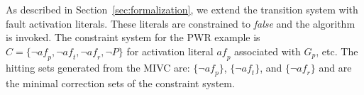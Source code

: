 As described in Section~\ref{sec:formalization}, we extend the transition system with fault activation literals. These literals are constrained to {\em false} and the \aivcalg algorithm is invoked. The constraint system for the PWR example is $C = \{\neg\mathit{af}_p, \neg\mathit{af}_t, \neg\mathit{af}_r, \neg P\}$ for activation literal $\mathit{af}_p$ associated with $G_p$, etc. The hitting sets generated from the MIVC are: $\{\neg\mathit{af}_p\}$, $\{\neg\mathit{af}_t\}$, and $\{\neg\mathit{af}_r\}$ and are the minimal correction sets of the constraint system. 